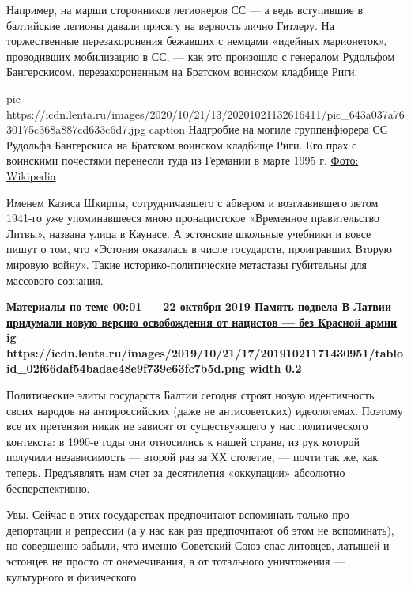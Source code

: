 Например, на марши сторонников легионеров СС — а ведь вступившие в балтийские
легионы давали присягу на верность лично Гитлеру. На торжественные
перезахоронения бежавших с немцами «идейных марионеток», проводивших
мобилизацию в СС, — как это произошло с генералом Рудольфом Бангерскисом,
перезахороненным на Братском воинском кладбище Риги.

\ifcmt
pic https://icdn.lenta.ru/images/2020/10/21/13/20201021132616411/pic_643a037a7630175c368a887cd633c6d7.jpg
caption Надгробие на могиле группенфюрера СС Рудольфа Бангерскиса на Братском воинском кладбище Риги. Его прах с воинскими почестями перенесли туда из Германии в марте 1995 г.  \href{https://upload.wikimedia.org/wikipedia/commons/0/06/BraluKapi_Bangerskis.jpg}{Фото: Wikipedia}
\fi


Именем Казиса Шкирпы, сотрудничавшего с абвером и возглавившего летом 1941-го
уже упоминавшееся мною пронацистское «Временное правительство Литвы», названа
улица в Каунасе. А эстонские школьные учебники и вовсе пишут о том, что
«Эстония оказалась в числе государств, проигравших Вторую мировую войну». Такие
историко-политические метастазы губительны для массового сознания.

\begin{leftbar}
	\bfseries
	Материалы по теме
00:01 — 22 октября 2019
Память подвела
\href{https://lenta.ru/articles/2019/10/22/free_riga/}{В Латвии придумали новую версию освобождения от нацистов — без Красной армии}
\ifcmt
	ig https://icdn.lenta.ru/images/2019/10/21/17/20191021171430951/tabloid_02f66daf54badae48e9f739e63fc7b5d.png
	width 0.2
\fi
\end{leftbar}

Политические элиты государств Балтии сегодня строят новую идентичность своих
народов на антироссийских (даже не антисоветских) идеологемах. Поэтому все их
претензии никак не зависят от существующего у нас политического контекста: в
1990-е годы они относились к нашей стране, из рук которой получили
независимость — второй раз за ХХ столетие, — почти так же, как теперь.
Предъявлять нам счет за десятилетия «оккупации» абсолютно бесперспективно.


Увы. Сейчас в этих государствах предпочитают вспоминать только про депортации и
репрессии (а у нас как раз предпочитают об этом не вспоминать), но совершенно
забыли, что именно Советский Союз спас литовцев, латышей и эстонцев не просто
от онемечивания, а от тотального уничтожения — культурного и физического.

